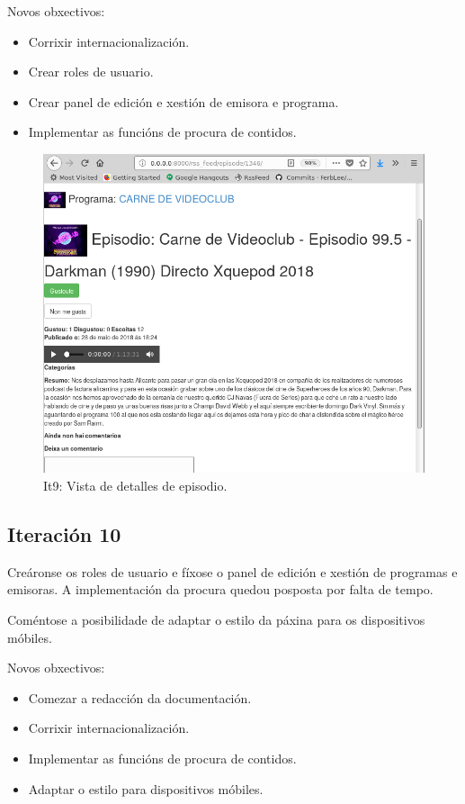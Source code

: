 Novos obxectivos:
\begin{itemize}
	\item Corrixir internacionalización.
	\item Crear roles de usuario.
	\item Crear panel de edición e xestión de emisora e programa.
	\item Implementar as funcións de procura de contidos.
\end{itemize}

\begin{figure}[h]
	\centering
	\includegraphics[scale=0.5,keepaspectratio=true]{./images/episode_detail_final.png}
	\caption{It9: Vista de detalles de episodio.}
	\label{fig:episode_detail_final}
\end{figure}


\subsection{Iteración 10}

Creáronse os roles de usuario e fíxose o panel de edición e xestión de programas e emisoras. A implementación da procura quedou posposta por falta de tempo.

Coméntose a posibilidade de adaptar o estilo da páxina para os dispositivos móbiles.

Novos obxectivos:
\begin{itemize}
	\item Comezar a redacción da documentación.
	\item Corrixir internacionalización.
	\item Implementar as funcións de procura de contidos.
	\item Adaptar o estilo para dispositivos móbiles.
\end{itemize}

